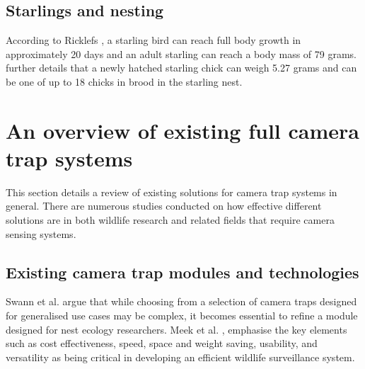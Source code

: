 \documentclass[class=report,11pt,crop=false]{standalone}
\begin{document}
\subsection{Starlings and nesting}

According to Ricklefs \cite{ricklefs1968patterns}, a starling bird can reach full body growth in approximately 20 days and an adult starling can reach a body mass of 79 grams. \cite{ricklefs1968patterns} further details that a newly hatched starling chick can weigh 5.27 grams and can be one of up to 18 chicks in brood in the starling nest. 



\section{An overview of existing full camera trap systems}
This section details a review of existing solutions for camera trap systems in general. There are numerous studies conducted on how effective different solutions are in both wildlife research and related fields that require camera sensing systems. 


\subsection{Existing camera trap modules and technologies}
Swann et al. \cite{swann2011evaluating} argue that while choosing from a selection of camera traps designed for generalised use cases may be complex, it becomes essential to refine a module designed for nest ecology researchers. Meek et al. \cite{meek2012user}, emphasise the key elements such as cost effectiveness, speed, space and weight saving, usability, and versatility as being critical in developing an efficient wildlife surveillance system.  
\end{document}
